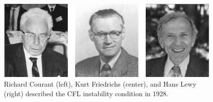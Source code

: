 \medskip

\begin{figure}[b]
\centerline{\includegraphics{Figures/f05Courant}}
\caption{Richard Courant (left), Kurt Friedrichs
(center), and  Hans Lewy (right) described the CFL
instability condition in 1928.}
\end{figure}



